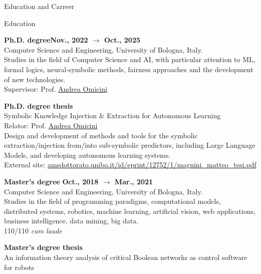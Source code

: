\documentclass{resume} %
\begin{document}
    \begin{rSection}{Education and Carreer}

        
        \begin{rSubsection2}{Education}

            \item\textbf{Ph.D. degree}\hfill \textbf{Nov., 2022 $\rightarrow$ Oct., 2025}
            \\Computer Science and Engineering, University of Bologna, Italy.
            \\Studies in the field of Computer Science and AI, with particular attention to ML, formal logics, neural-symbolic methods, fairness approaches and the development of new technologies.
            \\Supervisor: Prof. \href{mailto:andrea.omicini@unibo.it}{Andrea Omicini}
            \item\textbf{Ph.D. degree thesis}
            \\Symbolic Knowledge Injection \& Extraction for Autonomous Learning
            \\Relator: Prof. \href{mailto:andrea.omicini@unibo.it}{Andrea Omicini}
            \\Design and development of methods and tools for the symbolic extraction/injection from/into sub-symbolic predictors, including Large Language Models, and developing autonomous learning systems.
            \\External site: \url{amsdottorato.unibo.it/id/eprint/12752/1/magnini_matteo_tesi.pdf}
            \item\textbf{ Master's degree }\hfill \textbf{Oct., 2018 $\rightarrow$ Mar., 2021}
            \\Computer Science and Engineering, University of Bologna, Italy.
            \\Studies in the field of programming paradigms, computational models, distributed systems, robotics, machine learning, artificial vision, web applications, business intelligence, data mining, big data.
            \\110/110 \emph{cum laude}
            \item\textbf{ Master's degree thesis }
            \\An information theory analysis of critical Boolean networks as control software for robots

\end{rSubsection2}
\end{rSection}
\end{document}
